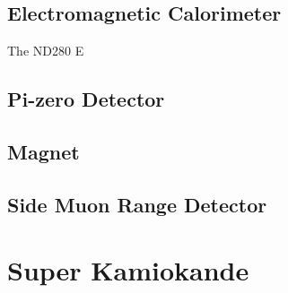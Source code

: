 \subsection{Electromagnetic Calorimeter}
The ND280 E\cite{t2k_ecal}

\subsection{Pi-zero Detector}
\cite{t2k_p0d}

\subsection{Magnet}

\subsection{Side Muon Range Detector}
\cite{t2k_smrd}

\section{Super Kamiokande}
\label{sec:sk}

\cite{t2k_sk, t2k_sk2, t2k_sk3}

